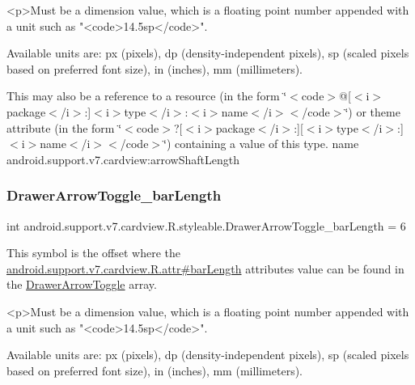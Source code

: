 \begin{DoxyVerb}      <p>Must be a dimension value, which is a floating point number appended with a unit such as "<code>14.5sp</code>".
\end{DoxyVerb}
 Available units are\+: px (pixels), dp (density-\/independent pixels), sp (scaled pixels based on preferred font size), in (inches), mm (millimeters). 

This may also be a reference to a resource (in the form \char`\"{}$<$code$>$@\mbox{[}$<$i$>$package$<$/i$>$\+:\mbox{]}$<$i$>$type$<$/i$>$\+:$<$i$>$name$<$/i$>$$<$/code$>$\char`\"{}) or theme attribute (in the form \char`\"{}$<$code$>$?\mbox{[}$<$i$>$package$<$/i$>$\+:\mbox{]}\mbox{[}$<$i$>$type$<$/i$>$\+:\mbox{]}$<$i$>$name$<$/i$>$$<$/code$>$\char`\"{}) containing a value of this type.  name android.\+support.\+v7.\+cardview\+:arrow\+Shaft\+Length \mbox{\label{classandroid_1_1support_1_1v7_1_1cardview_1_1R_1_1styleable_a40a9aac17c990350376902953712f1f3}} 
\subsubsection{\texorpdfstring{Drawer\+Arrow\+Toggle\+\_\+bar\+Length}{DrawerArrowToggle\_barLength}}
{\footnotesize\ttfamily int android.\+support.\+v7.\+cardview.\+R.\+styleable.\+Drawer\+Arrow\+Toggle\+\_\+bar\+Length = 6\hspace{0.3cm}{\ttfamily [static]}}

This symbol is the offset where the \hyperlink{classandroid_1_1support_1_1v7_1_1cardview_1_1R_1_1attr_a2ce9b99838a2d58ce2c820ccd5920e63}{android.\+support.\+v7.\+cardview.\+R.\+attr\#bar\+Length} attribute\textquotesingle{}s value can be found in the \hyperlink{classandroid_1_1support_1_1v7_1_1cardview_1_1R_1_1styleable_a159ca17c520d2f2d93f6152d01b0b8df}{Drawer\+Arrow\+Toggle} array.

\begin{DoxyVerb}      <p>Must be a dimension value, which is a floating point number appended with a unit such as "<code>14.5sp</code>".
\end{DoxyVerb}
 Available units are\+: px (pixels), dp (density-\/independent pixels), sp (scaled pixels based on preferred font size), in (inches), mm (millimeters). 

